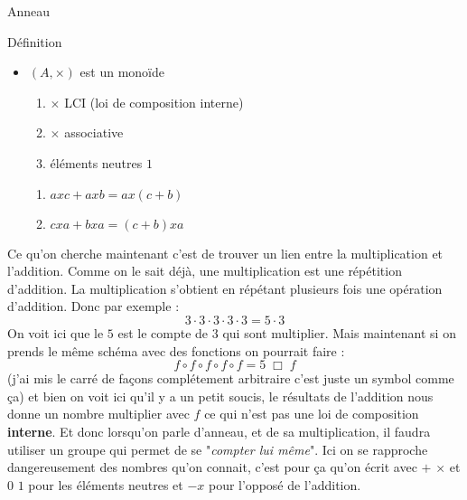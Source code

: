 \begin{parag}{Anneau}
\begin{subparag}{Définition}
\begin{itemize}
            \item $(A, \times)$ est un monoïde
            \begin{enumerate}
                \item $\times$ LCI (loi de composition interne)
                \item $\times$ associative
                \item éléments neutres $1$
            \end{enumerate}
            \begin{enumerate}
                \item $axc + axb = ax(c + b)$
                \item $cxa + bxa = (c+b)xa$
            \end{enumerate}
        \end{itemize}
        Ce qu'on cherche maintenant c'est de trouver un lien entre la multiplication et l'addition. Comme on le sait déjà, une multiplication est une répétition d'addition. La multiplication s'obtient en répétant plusieurs fois une opération d'addition. Donc par exemple :
        \[3 \cdot 3 \cdot 3 \cdot 3 \cdot 3 = 5\cdot 3\]
        On voit ici que le $5$ est le compte de $3$ qui sont multiplier. Mais maintenant si on prends le même schéma avec des fonctions on pourrait faire :
        \[f\circ f \circ f \circ f \circ f = 5 \; \Box \; f\]
        (j'ai mis le carré de façons complétement arbitraire c'est juste un symbol comme ça) et bien on voit ici qu'il y a un petit soucis, le résultats de l'addition nous donne un nombre multiplier avec $f$ ce qui n'est pas une loi de composition \textbf{interne}. Et donc lorsqu'on parle d'anneau, et de sa multiplication, il faudra utiliser un groupe qui permet de se "\textit{compter lui même}". Ici on se rapproche dangereusement des nombres qu'on connait, c'est pour ça qu'on écrit avec $+$ $\times$ et $0$ $1$ pour les éléments neutres et $-x$ pour l'opposé de l'addition.
        \\
    

\end{subparag}
\end{parag}
